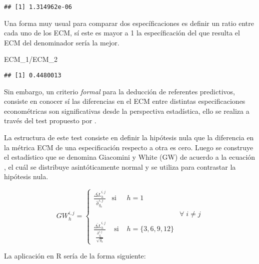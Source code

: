 \documentclass[
]{book}
\newenvironment{Shaded}{\begin{snugshade}}{\end{snugshade}}
\newcommand{\NormalTok}[1]{#1}
\newcommand{\SpecialCharTok}[1]{\textcolor[rgb]{0.00,0.00,0.00}{#1}}
\begin{document}
\begin{verbatim}
## [1] 1.314962e-06
\end{verbatim}

Una forma muy usual para comparar dos específicaciones es definir un ratio entre cada uno de los ECM, sí este es mayor a 1 la específicación del que resulta el ECM del denominador sería la mejor.

\begin{Shaded}
\begin{Highlighting}[]
\NormalTok{ECM\_1}\SpecialCharTok{/}\NormalTok{ECM\_2}
\end{Highlighting}
\end{Shaded}

\begin{verbatim}
## [1] 0.4480013
\end{verbatim}

Sin embargo, un criterio \emph{formal} para la deducción de referentes predictivos, consiste en conocer sí las diferencias en el ECM entre distintas especificaciones econométricas son significativas desde la perspectiva estadística, ello se realiza a través del test propuesto por \citet{Giacomini2006}.

La estructura de este test consiste en definir la hipótesis nula que la diferencia en la métrica ECM de una especificación respecto a otra es cero. Luego se construye el estadístico que se denomina Giacomini y White (GW) de acuerdo a la ecuación \label{eq:2}, el cuál se distribuye asintóticamente normal y se utiliza para contrastar la hipótesis nula.

\begin{equation} 
GW_{h}^{i,j}= \left\{ \begin{array}{lcll}
 \frac{\bar{\Delta L}^{i,j}_{h}}{\hat{\sigma}^{i,j}_{g_{h}}} & \mbox{si} & h=1 & \\
 & & & \forall\;i\neq j  \\
  \frac{\bar{\Delta L}^{i,j}_{h}}{\frac{\hat{\sigma}^{i,j}_{g_h}}{\sqrt{g_{h}}}} & \mbox{ si } & h = \{3,6,9,12\} & 
 \end{array}
 \right.
 \label{eq:2}
\end{equation}

La aplicación en R sería de la forma siguiente:
\end{document}
